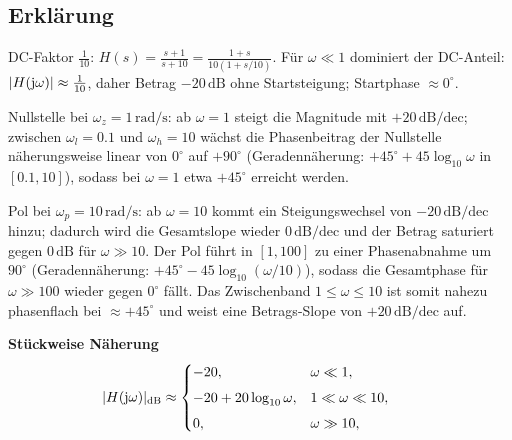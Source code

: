 \begin{center}
\end{center}
\newpage
\subsection{Erklärung}
\vspace{5mm}
\begin{description}[leftmargin=1.2em,labelsep=.6em,font=\bfseries]
\item[Schritt 1] DC-Faktor $\tfrac{1}{10}$: $H(s)=\tfrac{s+1}{s+10}=\tfrac{1+s}{10(1+s/10)}$. Für $\omega\ll1$ dominiert der DC-Anteil: $|H(\operatorname{j}\!\omega)|\approx\tfrac{1}{10}$, daher Betrag $-20\,\mathrm{dB}$ ohne Startsteigung; Startphase $\approx0^\circ$.
\item[Schritt 2] Nullstelle bei $\omega_z=1\,\mathrm{rad/s}$: ab $\omega=1$ steigt die Magnitude mit $+20\,\mathrm{dB/dec}$; zwischen $\omega_l=0.1$ und $\omega_h=10$ wächst die Phasenbeitrag der Nullstelle näherungsweise linear von $0^\circ$ auf $+90^\circ$ (Geradennäherung: $+45^\circ+45\log_{10}\omega$ in $[0.1,10]$), sodass bei $\omega=1$ etwa $+45^\circ$ erreicht werden.
\item[Schritt 3] Pol bei $\omega_p=10\,\mathrm{rad/s}$: ab $\omega=10$ kommt ein Steigungswechsel von $-20\,\mathrm{dB/dec}$ hinzu; dadurch wird die Gesamtslope wieder $0\,\mathrm{dB/dec}$ und der Betrag saturiert gegen $0\,\mathrm{dB}$ für $\omega\gg10$. Der Pol führt in $[1,100]$ zu einer Phasenabnahme um $90^\circ$ (Geradennäherung: $+45^\circ-45\log_{10}(\omega/10)$), sodass die Gesamtphase für $\omega\gg100$ wieder gegen $0^\circ$ fällt. Das Zwischenband $1\le\omega\le10$ ist somit nahezu phasenflach bei $\approx+45^\circ$ und weist eine Betrags-Slope von $+20\,\mathrm{dB/dec}$ auf.
\end{description}

\vspace{0.5cm}
\medskip
\noindent\textbf{Stückweise Näherung}
\[
|H(\operatorname{j}\!\omega)|_{\mathrm{dB}}\approx
\begin{cases}
-20,& \omega\ll1,\\[4pt]
-20+20\log_{10}\omega,& 1\ll\omega\ll10,\\[4pt]
0,& \omega\gg10,
\end{cases}
\qquad
\]
\newpage